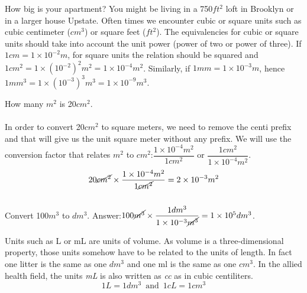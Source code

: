 \documentclass[main.tex]{subfiles}
\begin{document}
\begin{description}
\item[\docfilehook{Square or cubic units}{Square or cubic units}] How big is your apartment? You might be living in a 750$ft^2$ loft in Brooklyn or in a larger house Upstate. Often times we encounter cubic or square units such as cubic centimeter ($cm^3$) or square feet ($ft^2$). The equivalencies for cubic or square units should take into account the unit power (power of two or power of three). 
If $1cm=1\times 10^{-2}m$, for square units the relation should be squared and $1cm^2=1\times (10^{-2})^2m^2=1\times 10^{-4}m^2$. Similarly, if $1mm=1\times 10^{-3}m$, hence $1mm^3=1\times (10^{-3})^3m^3=1\times 10^{-9}m^3$.



\begin{example} %
How many $m^2$ is 20$cm^2$.\\
\\
In order to convert 20$cm^2$ to square meters, we need to remove the centi prefix and that will give us the unit square meter without any prefix. We will use the conversion factor that relates $m^2$ to $cm^2$:$\dfrac{1\times10^{-4}m^2}{1cm^2}$ or $\dfrac{1cm^2}{1\times10^{-4}m^2}$. 
 \begin{equation*}
20\cancel{cm^2} \times \dfrac{1\times10^{-4}m^2}{1\cancel{cm^2}}=2\times 10^{-3}m^2
\end{equation*}
\faDiamond\ \\
Convert 100$m^3$ to $dm^3$.
\flushright Answer:$100\cancel{m^3} \times \dfrac{1dm^3}{1\times10^{-3}\cancel{m^3}}=1\times 10^5dm^3$.
\end{example}%

\item[\docfilehook{Units of volume}{Units of volume}] Units such as L or mL are units of volume. As volume is a three-dimensional property, those units somehow have to be related to the units of length. In fact one litter is the same as one $dm^3$ and one ml is the same as one $cm^3$. In the allied health field, the units \emph{mL} is also written as \emph{cc} as in cubic centiliters.
\begin{equation*}
\boxed{   1L=1dm^3 \enspace \text{and}  \enspace1cL=1cm^3}   
\end{equation*}


\end{description}
\end{document}
